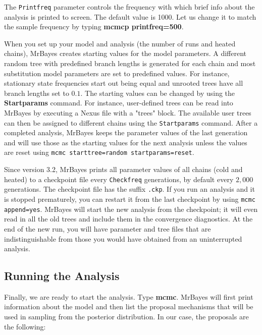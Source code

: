 \documentclass[12pt]{book}
\begin{document}
The \texttt{Printfreq} parameter controls the frequency with which brief info about the analysis is printed
 to screen. The default value is 1000. Let us change it to match the sample frequency by typing 
 \textbf{mcmcp printfreq=500}.

When you set up your model and analysis (the number of runs and heated chains), MrBayes creates starting
 values for the model parameters. A different random tree with predefined branch lengths is generated for
 each chain and most substitution model parameters are set to predefined values. For instance, stationary
 state frequencies start out being equal and unrooted trees have all branch lengths set to $0.1$. The 
 starting values can be changed by using the \textbf{Startparams} command. For instance, user-defined trees
 can be read into MrBayes by executing a Nexus file with a "trees" block. The available user trees can then
 be assigned to different chains using the \texttt{Startparams} command. After a completed analysis, MrBayes
 keeps the parameter values of the last generation and will use those as the starting values for the next
 analysis unless the values are reset using \texttt{mcmc starttree=random startparams=reset}.

Since version 3.2, MrBayes prints all parameter values of all chains (cold and heated) to a checkpoint file
 every \texttt{Checkfreq} generations, by default every $2,000$ generations. The checkpoint file has the
 suffix \texttt{.ckp}. If you run an analysis and it is stopped prematurely, you can restart it from the
 last checkpoint by using \texttt{mcmc append=yes}. MrBayes will start the new analysis from the checkpoint;
 it will even read in all the old trees and include them in the convergence diagnostics. At the end of the
 new run, you will have parameter and tree files that are indistinguishable from those you would have
 obtained from an uninterrupted analysis.

\subsection{Running the Analysis}

Finally, we are ready to start the analysis. Type \textbf{mcmc}. MrBayes will first print information about
 the model and then list the proposal mechanisms that will be used in sampling from the posterior 
 distribution. In our case, the proposals are the following:
\end{document}
